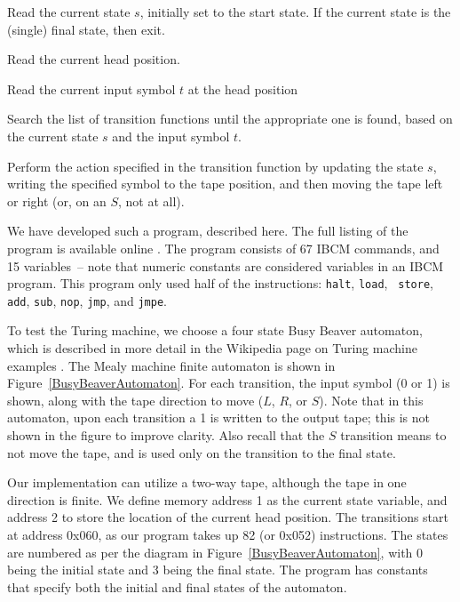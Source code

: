 \begin{itemlist}
\item Read the current state $s$, initially set to the start state.
  If the current state is the (single) final state, then exit.
\item Read the current head position.
\item Read the current input symbol $t$ at the head position
\item Search the list of transition functions until the appropriate
  one is found, based on the current state $s$ and the input symbol
  $t$.
\item Perform the action specified in the transition function by
  updating the state $s$, writing the specified symbol to the tape
  position, and then moving the tape left or right (or, on an $S$, not
  at all).
\end{itemlist}

We have developed such a program, described here.  The full listing of
the program is available online \cite{ibcm-website}.  The program
consists of 67 IBCM commands, and 15 variables~-- note that numeric
constants are considered variables in an IBCM program.  This program
only used half of the instructions: {\tt halt}, {\tt load}, {\tt
  store}, {\tt add}, {\tt sub}, {\tt nop}, {\tt jmp}, and {\tt jmpe}.

To test the Turing machine, we choose a four state Busy Beaver
automaton, which is described in more detail in the Wikipedia page on
Turing machine examples \cite{wikipedia:turingmachineexamples}.  The
Mea\-ly machine finite automaton is shown in
Figure~\ref{BusyBeaverAutomaton}.  For each transition, the input
symbol (0 or 1) is shown, along with the tape direction to move ($L$,
$R$, or $S$).  Note that in this automaton, upon each transition a 1
is written to the output tape; this is not shown in the figure to
improve clarity.  Also recall that the $S$
transition means to not move the tape, and is used only on the
transition to the final state.

Our implementation can utilize a two-way tape, although the tape in
one direction is finite.  We define memory address 1 as the current
state variable, and address 2 to store the location of the current
head position.  The transitions start at address 0x060, as our program
takes up 82 (or 0x052) instructions.  The states are numbered as per
the diagram in Figure~\ref{BusyBeaverAutomaton}, with 0 being the
initial state and 3 being the final state.  The program has constants
that specify both the initial and final states of the automaton.

